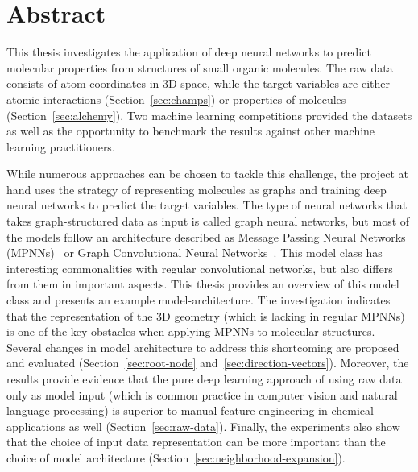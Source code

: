 %


%
%


\section*{\Huge{Abstract}}

\vspace{1cm}
\noindent This thesis investigates the application of deep neural networks to predict molecular properties from structures of small organic molecules. The raw data consists of atom coordinates in 3D space, while the target variables are either atomic interactions (Section~\ref{sec:champs}) or properties of molecules (Section~\ref{sec:alchemy}). Two machine learning competitions provided the datasets as well as the opportunity to benchmark the results against other machine learning practitioners.

While numerous approaches can be chosen to tackle this challenge, the project at hand uses the strategy of representing molecules as graphs and training deep neural networks to predict the target variables. The type of neural networks that takes graph-structured data as input is called graph neural networks, but most of the models follow an architecture described as Message Passing Neural Networks (MPNNs)~\cite{Gilmer2017} or Graph Convolutional Neural Networks~\cite{Schutt2017}. This model class has interesting commonalities with regular convolutional networks, but also differs from them in important aspects. This thesis provides an overview of this model class and presents an example model-architecture. The investigation indicates that the representation of the 3D geometry (which is lacking in regular MPNNs) is one of the key obstacles when applying MPNNs to molecular structures. Several changes in model architecture to address this shortcoming are proposed and evaluated (Section~\ref{sec:root-node} and~\ref{sec:direction-vectors}). Moreover, the results provide evidence that the pure deep learning approach of using raw data only as model input (which is common practice in computer vision and natural language processing) is superior to manual feature engineering in chemical applications as well (Section~\ref{sec:raw-data}). Finally, the experiments also show that the choice of input data representation can be more important than the choice of model architecture (Section~\ref{sec:neighborhood-expansion}).

